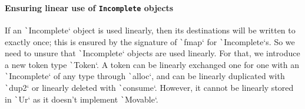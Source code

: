 \documentclass[english]{jflart}
\begin{document}




\paragraph{Ensuring linear use of \texttt{Incomplete} objects}

If an \texttt`Incomplete` object is used linearly, then its destinations will be written to exactly once; this is ensured by the signature of \texttt`fmap` for \texttt`Incomplete`s. So we need to unsure that \texttt`Incomplete` objects are used linearly. For that, we introduce a new token type \texttt`Token`. A token can be linearly exchanged one for one with an \texttt`Incomplete` of any type through \texttt`alloc`, and can be linearly duplicated with \texttt`dup2` or linearly deleted with \texttt`consume`. However, it cannot be linearly stored in \texttt`Ur` as it doesn't implement \texttt`Movable`.
\end{document}
